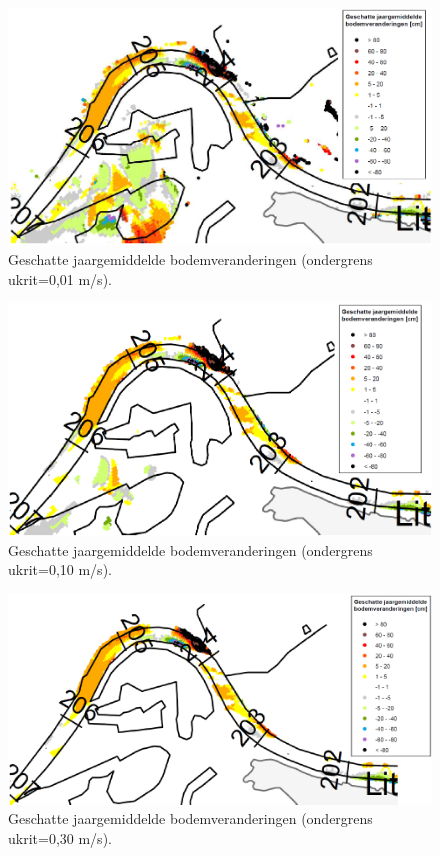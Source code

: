 \begin{figure}
\includegraphics[width=\columnwidth]{figures/Fig14a.png}
\caption{Geschatte jaargemiddelde bodemveranderingen (ondergrens ukrit=0,01 m/s).}
\label{Fig14a}
\end{figure}

\begin{figure}
\includegraphics[width=\columnwidth]{figures/Fig14b.png}
\caption{Geschatte jaargemiddelde bodemveranderingen (ondergrens ukrit=0,10 m/s).}
\label{Fig14b}
\end{figure}

\begin{figure}
\includegraphics[width=\columnwidth]{figures/Fig14c.png}
\caption{Geschatte jaargemiddelde bodemveranderingen (ondergrens ukrit=0,30 m/s).}
\label{Fig14c}
\end{figure}

